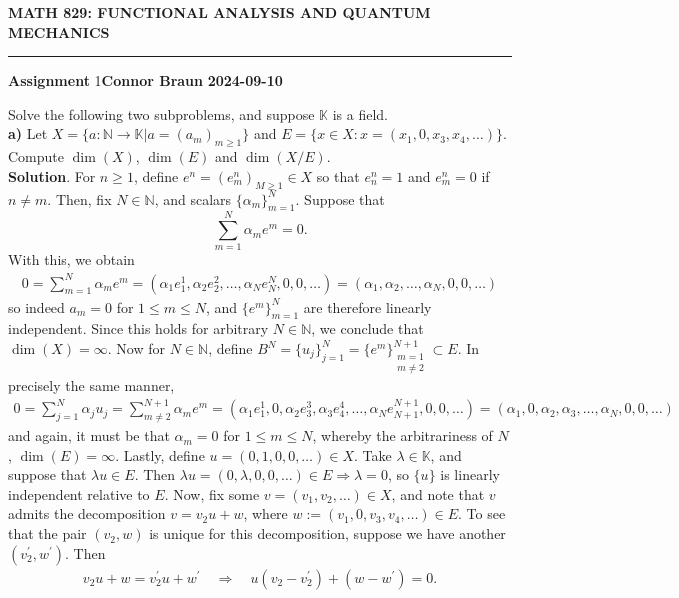 \documentclass[10pt]{article}
\newcommand{\mbb}[1]{\mathbb{#1}}
\newcommand{\1}[1]{\mathbbm{1}_{#1}}
\begin{document}
    \begin{center}
        {\bf\large{MATH 829: FUNCTIONAL ANALYSIS AND QUANTUM MECHANICS}}
        \smallskip
        \hrule
        \smallskip
        {\bf Assignment} 1\hfill {\bf Connor Braun} \hfill {\bf 2024-09-10}
    \end{center}
    \vspace{5pt}
     Solve the following two subproblems, and suppose $\mbb{K}$ is a field.\\[5pt]
    {\bf a)} Let $X=\{a:\mbb{N}\rightarrow\mbb{K}|a=(a_m)_{m\geq 1}\}$ and $E=\{x\in X:x=(x_1,0,x_3,x_4,\dots)\}$. Compute $\dim(X)$, $\dim(E)$ and $\dim(X/E)$.\\[5pt]
    {\bf Solution}. For $n\geq 1$, define $e^n=(e^n_m)_{M\geq 1}\in X$ so that $e^n_n=1$ and $e^n_m=0$ if $n\neq m$. Then, fix $N\in\mbb{N}$, and scalars $\{\alpha_m\}_{m=1}^N$. Suppose that
    \[\sum_{m=1}^N\alpha_me^m=0.\] 
    With this, we obtain
    \begin{align*}
        0=\sum_{m=1}^N\alpha_me^m=(\alpha_1e^1_1,\alpha_2e^2_2,\dots,\alpha_Ne^N_N,0,0,\dots)=(\alpha_1,\alpha_2,\dots,\alpha_N,0,0,\dots)
    \end{align*}
    so indeed $a_m=0$ for $1\leq m\leq N$, and $\{e^m\}_{m=1}^N$ are therefore linearly independent. Since this holds for arbitrary $N\in\mbb{N}$, we conclude that $\dim(X)=\infty$.
    Now for $N\in\mbb{N}$, define $B^N=\{u_j\}_{j=1}^N=\{e^m\}_{\substack{m=1 \\ m\neq 2}}^{N+1}\subset E$. In precisely the same manner,
    \begin{align*}
        0=\sum_{j=1}^N\alpha_ju_j=\sum_{m\neq 2}^{N+1}\alpha_me^m=(\alpha_1e^1_1,0,\alpha_2e^3_3,\alpha_3e^4_4,\dots,\alpha_Ne^{N+1}_{N+1},0,0,\dots)=(\alpha_1,0,\alpha_2,\alpha_3,\dots,\alpha_N,0,0,\dots)
    \end{align*}
    and again, it must be that $\alpha_m=0$ for $1\leq m\leq N$, whereby the arbitrariness of $N$, $\dim(E)=\infty$. Lastly, define $u=(0,1,0,0,\dots)\in X$. Take $\lambda\in\mbb{K}$, and suppose that $\lambda u\in E$. Then
    $\lambda u=(0,\lambda,0,0,\dots)\in E\Rightarrow \lambda=0$, so $\{u\}$ is linearly independent relative to $E$. Now, fix some $v=(v_1,v_2,\dots)\in X$, and note that $v$ admits the decomposition
    $v=v_2u+w$, where $w:=(v_1,0,v_3,v_4,\dots)\in E$. To see that the pair $(v_2,w)$ is unique for this decomposition, suppose we have another $(v_2^\prime,w^\prime)$. Then
    \begin{align*}
        v_2u+w=v_2^\prime u+w^\prime\quad\Rightarrow\quad u(v_2-v_2^\prime)+(w-w^\prime)=0.
    \end{align*}
\end{document}
